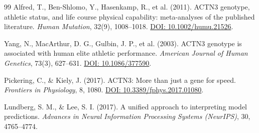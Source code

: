 \documentclass[11pt,a4paper]{article}
\begin{document}
\begin{thebibliography}{99}
Alfred, T., Ben-Shlomo, Y., Hasenkamp, R., et al. (2011). ACTN3 genotype, athletic status, and life course physical capability: meta-analyses of the published literature. \textit{Human Mutation}, 32(9), 1008--1018. \href{https://doi.org/10.1002/humu.21526}{DOI: 10.1002/humu.21526}.

Yang, N., MacArthur, D. G., Gulbin, J. P., et al. (2003). ACTN3 genotype is associated with human elite athletic performance. \textit{American Journal of Human Genetics}, 73(3), 627--631. \href{https://doi.org/10.1086/377590}{DOI: 10.1086/377590}.

Pickering, C., \& Kiely, J. (2017). ACTN3: More than just a gene for speed. \textit{Frontiers in Physiology}, 8, 1080. \href{https://doi.org/10.3389/fphys.2017.01080}{DOI: 10.3389/fphys.2017.01080}.

Lundberg, S. M., \& Lee, S. I. (2017). A unified approach to interpreting model predictions. \textit{Advances in Neural Information Processing Systems (NeurIPS)}, 30, 4765--4774.

\end{thebibliography}
\end{document}
